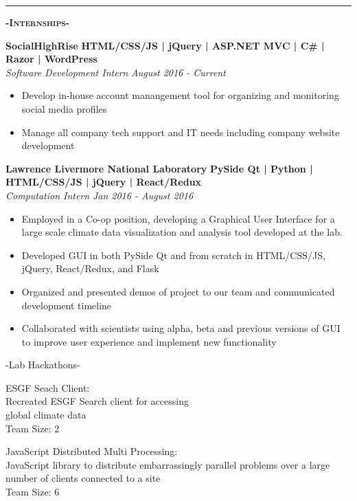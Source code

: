 \documentclass[12pt]{article}
\begin{document}
\noindent\rule{19cm}{0.4pt}

\center
\color{black}
\color{black}
\begin{center}
\textbf{\textsc{-Internships-}}\\
\end{center}
\begin{footnotesize}
\flushleft
\color{Cerulean}\textbf{SocialHighRise}\hfill \color{TealBlue} \textbf{HTML/CSS/JS | jQuery | ASP.NET MVC | C\# | Razor | WordPress } \\ \color{Black}\textit{Software Development Intern} \hfill \textit{August 2016 - Current}
\color{black}
\begin{itemize}
    \setlength{\itemsep}{0pt}
	\item Develop in-house account manangement tool for organizing and monitoring social media profiles
	\item Manage all company tech support and IT needs including company website development
\end{itemize}
\color{Cerulean}\textbf{Lawrence Livermore National Laboratory} \color{Black} \hfill
\color{TealBlue} \textbf{PySide Qt | Python | HTML/CSS/JS | jQuery | React/Redux}\\
\color{Black} \textit{Computation Intern} \hfill\textit{Jan 2016 - August 2016} 
\color{Black}
\begin{itemize}
    \setlength{\itemsep}{0pt}
	\item Employed in a Co-op position, developing a Graphical User Interface for a large scale climate data visualization and analysis tool developed at the lab.
	\item Developed GUI in both PySide Qt and from scratch in HTML/CSS/JS, jQuery, React/Redux, and Flask

	\item Organized and presented demos of project to our team and communicated development timeline
	\item Collaborated with scientists using alpha, beta and previous versions of GUI to improve user experience and implement new functionality
\end{itemize}

\center
-Lab Hackathons-
\begin{multicols}{2}
\center
\color{Cerulean}ESGF Seach Client:\\ \color{black}
Recreated ESGF Search client for accessing\\
global climate data\\
Team Size: 2

\columnbreak

\color{Cerulean}JavaScript Distributed Multi Processing:\\ \color{black}
JavaScript library to distribute embarrassingly parallel problems over a large number of clients connected to a site\\
Team Size: 6


\end{multicols}
\medskip

\end{footnotesize}
\end{document}
